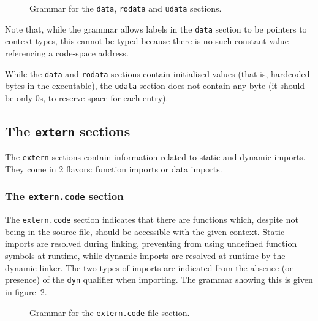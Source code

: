 \begin{figure}[htb]
  \centering

  \caption{Grammar for the \texttt{data}, \texttt{rodata} and \texttt{udata} sections.}
  \label{fig:nstar-common-sections-data-grammar}
\end{figure}

\noindent Note that, while the grammar allows labels in the \texttt{data} section to be pointers to context types, this cannot be typed because there is no such constant value referencing a code-space address.

While the \texttt{data} and \texttt{rodata} sections contain initialised values (that is, hardcoded bytes in the executable), the \texttt{udata} section does not contain any byte (it should be only $0$s, to reserve space for each entry).

\subsection{The \texttt{extern} sections}\label{subsec:nstar-common-sections-extern}

The \texttt{extern} sections contain information related to static and dynamic imports.
They come in 2 flavors: function imports or data imports.

\subsubsection{The \texttt{extern.code} section}\label{subsubsec:nstar-common-sections-extern-code}

The \texttt{extern.code} section indicates that there are functions which, despite not being in the source file, should be accessible with the given context.
Static imports are resolved during linking, preventing from using undefined function symbols at runtime, while dynamic imports are resolved at runtime by the dynamic linker.
The two types of imports are indicated from the absence (or presence) of the \texttt{dyn} qualifier when importing.
The grammar showing this is given in figure~\ref{fig:nstar-common-sections-extern-code-grammar}.

\begin{figure}[htb]
  \centering

  \caption{Grammar for the \texttt{extern.code} file section.}
  \label{fig:nstar-common-sections-extern-code-grammar}
\end{figure}

